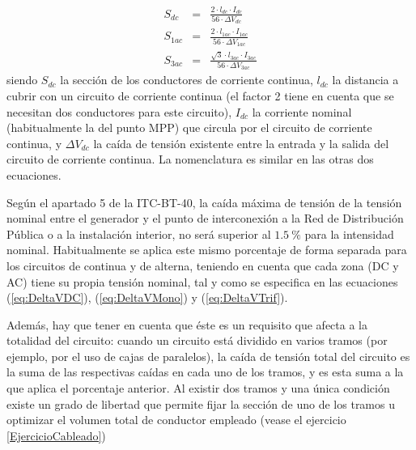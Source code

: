 \begin{eqnarray}
  S_{dc} & = & \frac{2\cdot l_{dc}\cdot I_{dc}}{56\cdot\Delta V_{dc}}\label{eq:DeltaVDC}\\
  S_{1ac} & = & \frac{2\cdot l_{1ac}\cdot I_{1ac}}{56\cdot\Delta V_{1ac}}\label{eq:DeltaVMono}\\
  S_{3ac} & = & \frac{\sqrt{3}\cdot l_{3ac}\cdot
    I_{3ac}}{56\cdot\Delta V_{3ac}}\label{eq:DeltaVTrif}
\end{eqnarray}
siendo $S_{dc}$ la sección de los conductores de corriente continua,
$l_{dc}$ la distancia a cubrir con un circuito de corriente continua
(el factor 2 tiene en cuenta que se necesitan dos conductores para
este circuito), $I_{dc}$ la corriente nominal (habitualmente la del
punto MPP) que circula por el circuito de corriente continua, y
$\Delta V_{dc}$ la caída de tensión existente entre la entrada y la
salida del circuito de corriente continua. La nomenclatura es similar
en las otras dos ecuaciones.  
 
 
 

Según el apartado 5 de la ITC-BT-40, la caída máxima de tensión de la
tensión nominal entre el generador y el punto de interconexión a la
Red de Distribución Pública o a la instalación interior, no será
superior al $\SI{1.5}{\percent}$ para la intensidad nominal.
Habitualmente se aplica este mismo porcentaje de forma separada para
los circuitos de continua y de alterna, teniendo en cuenta que cada
zona (DC y AC) tiene su propia tensión nominal, tal y como se
especifica en las ecuaciones (\ref{eq:DeltaVDC}),
(\ref{eq:DeltaVMono}) y (\ref{eq:DeltaVTrif}).

Además, hay que tener en cuenta que éste es un requisito que afecta a la
totalidad del circuito: cuando un circuito está dividido en varios
tramos (por ejemplo, por el uso de cajas de paralelos), la caída de
tensión total del circuito es la suma de las respectivas caídas en cada uno de los
tramos, y es esta suma a la que aplica el porcentaje anterior. Al
existir dos tramos y una única condición existe un grado de libertad
que permite fijar la sección de uno de los tramos u optimizar el
volumen total de conductor empleado (vease el ejercicio
\ref{EjercicioCableado})

